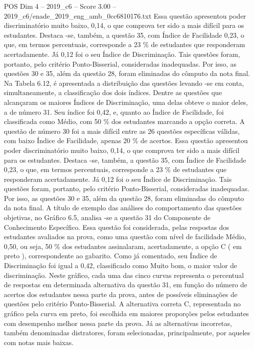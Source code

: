 \begin{textsample}{POS Dim 4 – 2019\_c6 – Score 3.00 – 2019\_c6/enade\_2019\_eng\_amb\_0cc6810176.txt}
Essa questão apresentou poder discriminatório muito baixo, 0,14, o que comprova ter sido a mais difícil para os estudantes.
Destaca -se, também, a questão 35, com Índice de Facilidade 0,23, o que, em termos percentuais, corresponde a 23 \% de estudantes que responderam acertadamente.
Já 0,12 foi o seu Índice de Discriminação.
Tais questões foram, portanto, pelo critério Ponto-Bisserial, consideradas inadequadas.
Por isso, as questões 30 e 35, além da questão 28, foram eliminadas do cômputo da nota final.
Na Tabela 6.12, é apresentada a distribuição das questões levando -se em conta, simultaneamente, a classificação dos dois índices.
Dentre as questões que alcançaram os maiores Índices de Discriminação, uma delas obteve o maior deles, a de número 31.
Seu índice foi 0,42, e, quanto ao Índice de Facilidade, foi classificada como Médio, com 50 \% dos estudantes marcando a opção correta.
A questão de número 30 foi a mais difícil entre as 26 questões específicas válidas, com baixo Índice de Facilidade, apenas 20 \% de acertos.
Essa questão apresentou poder discriminatório muito baixo, 0,14, o que comprova ter sido a mais difícil para os estudantes.
Destaca -se, também, a questão 35, com Índice de Facilidade 0,23, o que, em termos percentuais, corresponde a 23 \% de estudantes que responderam acertadamente.
Já 0,12 foi o seu Índice de Discriminação.
Tais questões foram, portanto, pelo critério Ponto-Bisserial, consideradas inadequadas.
Por isso, as questões 30 e 35, além da questão 28, foram eliminadas do cômputo da nota final.
A título de exemplo das análises do comportamento das questões objetivas, no Gráfico 6.5, analisa -se a questão 31 do Componente de Conhecimento Específico.
Essa questão foi considerada, pelas respostas dos estudantes avaliados na prova, como uma questão com nível de facilidade Médio, 0,50, ou seja, 50 \% dos estudantes assinalaram, acertadamente, a opção C ( em preto ), correspondente ao gabarito.
Como já comentado, seu Índice de Discriminação foi igual a 0,42, classificado como Muito bom, o maior valor de discriminação.
Neste gráfico, cada uma das cinco curvas representa o percentual de respostas em determinada alternativa da questão 31, em função do número de acertos dos estudantes nessa parte da prova, antes de possíveis eliminações de questões pelo critério Ponto-Bisserial.
A alternativa correta C, representada no gráfico pela curva em preto, foi escolhida em maiores proporções pelos estudantes com desempenho melhor nessa parte da prova.
Já as alternativas incorretas, também denominadas distratores, foram selecionadas, principalmente, por aqueles com notas mais baixas.

\end{textsample}
